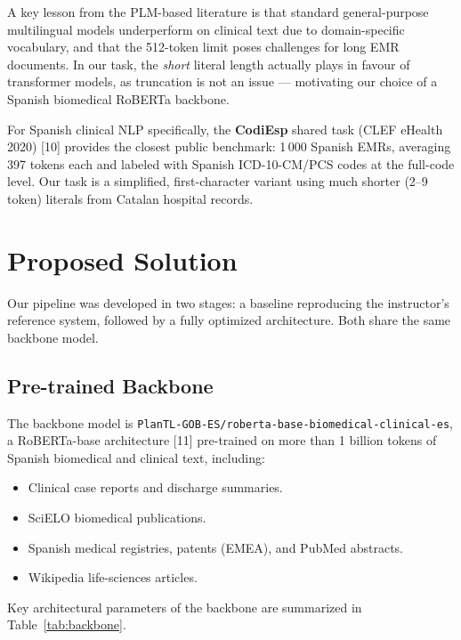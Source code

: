 \documentclass[10pt,a4paper,twocolumn]{article}
\begin{document}
A key lesson from the PLM-based literature is that standard general-purpose
multilingual models underperform on clinical text due to domain-specific
vocabulary, and that the 512-token limit poses challenges for long EMR documents.
In our task, the \textit{short} literal length actually plays in favour of
transformer models, as truncation is not an issue --- motivating our choice of
a Spanish biomedical RoBERTa backbone.

For Spanish clinical NLP specifically, the \textbf{CodiEsp} shared task
(CLEF eHealth 2020) [10] provides the closest public benchmark: 1\,000 Spanish
EMRs, averaging 397 tokens each and labeled with Spanish ICD-10-CM/PCS codes
at the full-code level. Our task is a simplified, first-character variant using
much shorter (2--9 token) literals from Catalan hospital records.

\section{Proposed Solution}
\label{sec:method}

Our pipeline was developed in two stages: a baseline reproducing the instructor's
reference system, followed by a fully optimized architecture. Both share the same
backbone model.

\subsection{Pre-trained Backbone}

The backbone model is \texttt{PlanTL-GOB-ES/roberta-base-biomedical-clinical-es},
a RoBERTa-base architecture [11] pre-trained on more than 1 billion tokens of
Spanish biomedical and clinical text, including:

\begin{itemize}
  \item Clinical case reports and discharge summaries.
  \item SciELO biomedical publications.
  \item Spanish medical registries, patents (EMEA), and PubMed abstracts.
  \item Wikipedia life-sciences articles.
\end{itemize}

Key architectural parameters of the backbone are summarized in
Table~\ref{tab:backbone}.
\end{document}
